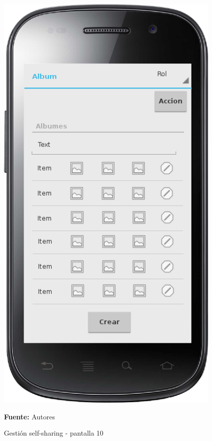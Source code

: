 \begin{figure}[!htb]
  \begin{center}
    \includegraphics[width=11cm]{./imagenes/UI/Self_sharing/self_sharing_10.png}
    \caption{Gestión self-sharing - pantalla 10}
    \label{fig:self_sharing_}
    \textbf{Fuente:}  Autores
  \end{center}
\end{figure}

